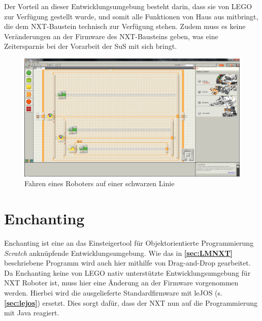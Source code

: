 \documentclass[paper=a4, DIV=calc, BCOR=12mm, twoside=on, onecolumn=on, open = right, titlepage =on, parskip =half-, headsepline = on, footsepline = off, chapterprefix = off, appendixprefix = on, fontsize = 12pt, numbers = noenddot, abstract = on]{scrbook}
\begin{document}
Der Vorteil an dieser Entwicklungsumgebung besteht darin, dass sie von \textsc{LEGO} zur Verfügung gestellt wurde, und somit alle Funktionen von Haus aus mitbringt, die dem NXT-Baustein technisch zur Verfügung stehen. Zudem muss es keine Veränderungen an der Firmware des NXT-Bausteins geben, was eine Zeitersparnis bei der Vorarbeit der SuS mit sich bringt.

\begin{figure}[htb]
\centering
\includegraphics[width=\textwidth]{images/Beispielprogramm_NXT.png} 
\caption{Fahren eines Roboters auf einer schwarzen Linie}
\label{fig:Bsp NXT}
\end{figure}


\section{Enchanting}
\label{sec:enchanting}
Enchanting ist eine an das Einsteigertool für Objektorientierte Programmierung \emph{Scratch} anknüpfende Entwicklungsumgebung. Wie das in \textbf{\ref{sec:LMNXT}} beschriebene Programm wird auch hier mithilfe von Drag-and-Drop gearbeitet. Da Enchanting keine von LEGO nativ unterstützte Entwicklungsumgebung für NXT Roboter ist, muss hier eine Änderung an der Firmware vorgenommen werden. Hierbei wird die ausgelieferte Standardfirmware mit leJOS (s. \textbf{\ref{sec:lejos}}) ersetzt. Dies sorgt dafür, dass der NXT nun auf die Programmierung mit Java reagiert.
\end{document}
